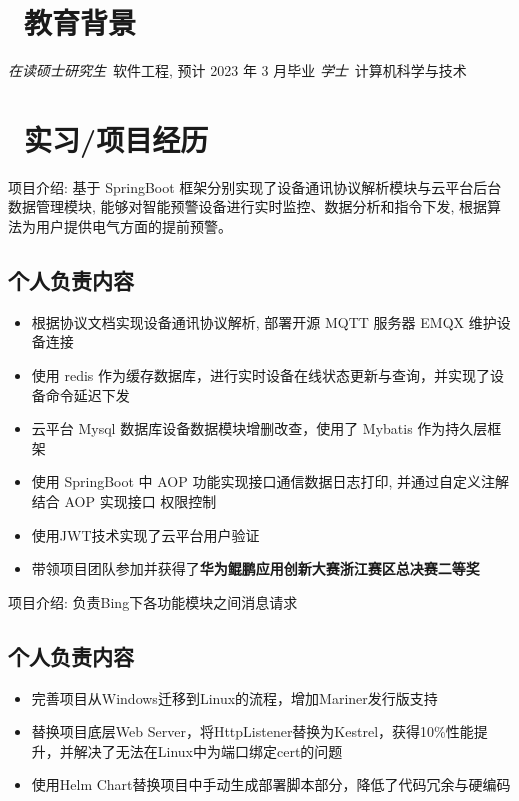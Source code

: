 \documentclass{resume}
\begin{document}


 
\section{\faGraduationCap\  教育背景}
\textit{在读硕士研究生}\ 软件工程, 预计 2023 年 3 月毕业
\textit{学士}\ 计算机科学与技术

\section{\faUsers\ 实习/项目经历}
项目介绍: 基于 SpringBoot 框架分别实现了设备通讯协议解析模块与云平台后台数据管理模块, 能够对智能预警设备进行实时监控、数据分析和指令下发, 根据算法为用户提供电气方面的提前预警。
\subsection{个人负责内容}
\begin{itemize}
  \item 根据协议文档实现设备通讯协议解析, 部署开源 MQTT 服务器 EMQX 维护设备连接
  \item 使用 redis 作为缓存数据库，进行实时设备在线状态更新与查询，并实现了设备命令延迟下发
  \item 云平台 Mysql 数据库设备数据模块增删改查，使用了 Mybatis 作为持久层框架
  \item 使用 SpringBoot 中 AOP 功能实现接口通信数据日志打印, 并通过自定义注解结合 AOP 实现接口
权限控制
  \item 使用JWT技术实现了云平台用户验证
  \item 带领项目团队参加并获得了\textbf{华为鲲鹏应用创新大赛浙江赛区总决赛二等奖}
\end{itemize}

项目介绍: 负责Bing下各功能模块之间消息请求
\subsection{个人负责内容}
\begin{itemize}
  \item 完善项目从Windows迁移到Linux的流程，增加Mariner发行版支持
  \item 替换项目底层Web Server，将HttpListener替换为Kestrel，获得10\%性能提升，并解决了无法在Linux中为端口绑定cert的问题
  \item 使用Helm Chart替换项目中手动生成部署脚本部分，降低了代码冗余与硬编码
\end{itemize}
\end{document}
